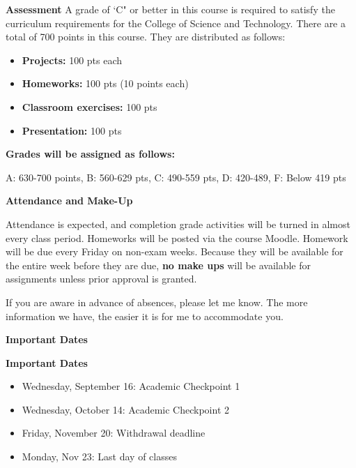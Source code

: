 \documentclass[12pt]{article}
\let\oldtextbf\textbf
\renewcommand{\textbf}[1]{\textcolor{coolblack}{\oldtextbf{#1}}}
\begin{document}
\bigskip

\begin{flushleft}
\textbf{Assessment}
A grade of `C" or better in this course is required to satisfy the curriculum requirements for the College of Science and Technology. There are a total of 700 points in this course. They are distributed as follows:

\begin{itemize}
\item \textbf{Projects:} 100 pts each
\item \textbf{Homeworks:} 100 pts (10 points each)
\item \textbf{Classroom exercises:} 100 pts
\item \textbf{Presentation:} 100 pts
\end{itemize}	

\bigskip

\textbf{Grades will be assigned as follows:}

A: 630-700 points, B: 560-629 pts, C: 490-559 pts, D: 420-489, F: Below 419 pts

\end{flushleft}

\bigskip

\begin{flushleft}
\textbf{Attendance and Make-Up}
\end{flushleft}

 Attendance is expected, and completion grade activities will be turned in almost every class period. Homeworks will be posted via the course Moodle. Homework will be due every Friday on non-exam weeks. Because they will be available for the entire week before they are due, \textbf{no make ups} will be available for assignments unless prior approval is granted. \par
 If you are aware in advance of absences, please let me know. The more information we have, the easier it is for me to accommodate you. \par

\begin{flushleft}
\textbf{Important Dates}
\end{flushleft}

\begin{flushleft}
\textbf{Important Dates}
\end{flushleft}

\begin{itemize}
\item Wednesday, September 16: Academic Checkpoint 1	
\item Wednesday, October 14: Academic Checkpoint 2	
\item Friday, November 20: Withdrawal deadline
\item Monday, Nov 23: Last day of classes

\end{itemize}
\end{document}
